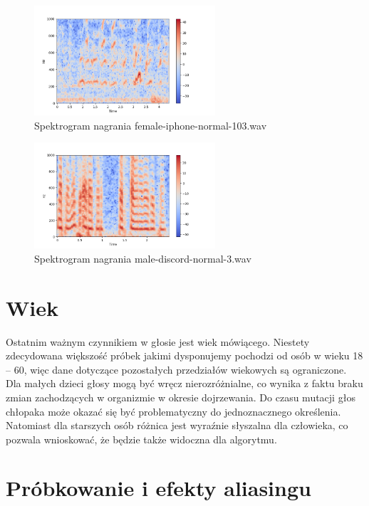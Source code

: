 \documentclass[a4paper,12pt]{extarticle}
\begin{document}
\begin{figure}[ht]
\centering
\includegraphics[width=0.6\textwidth]{6_female-iphone-normal-103.png}
\caption{ Spektrogram nagrania female-iphone-normal-103.wav}
\end{figure}

\begin{figure}[ht]
\centering
\includegraphics[width=0.6\textwidth]{6_male-discord-normal-3.png}
\caption{ Spektrogram nagrania male-discord-normal-3.wav}
\end{figure}

\newpage

\section*{Wiek}

Ostatnim ważnym czynnikiem w głosie jest wiek mówiącego. Niestety zdecydowana większość próbek jakimi dysponujemy pochodzi od osób w wieku 18 – 60, więc dane dotyczące pozostałych przedziałów wiekowych są ograniczone. Dla małych dzieci głosy mogą być wręcz nierozróżnialne, co wynika z faktu braku zmian zachodzących w organizmie w okresie dojrzewania. Do czasu mutacji głos chłopaka może okazać się być problematyczny do jednoznacznego określenia. Natomiast dla starszych osób różnica jest wyraźnie słyszalna dla człowieka, co pozwala wnioskować, że będzie także widoczna dla algorytmu.

\newpage

\section{Próbkowanie i efekty aliasingu}
\label{sec:aliasing}
\end{document}
